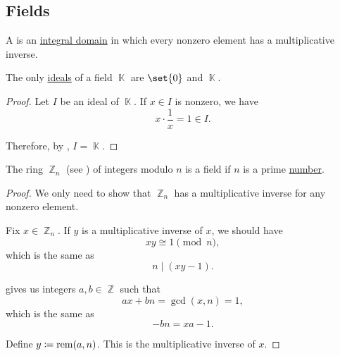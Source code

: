 \subsection{Fields}\label{subsec:fields}

\begin{definition}\label{def:field}
  A  is an \hyperref[def:integral_domain]{integral domain} in which every nonzero element has a multiplicative inverse.
\end{definition}

\begin{proposition}\label{thm:ideals_of_field}
  The only \hyperref[def:semiring_ideal]{ideals} of a field \( \BbbK \) are \( \set{ 0 } \) and \( \BbbK \).
\end{proposition}
\begin{proof}
  Let \( I \) be an ideal of \( \BbbK \). If \( x \in I \) is nonzero, we have
  \begin{equation*}
    x \cdot \frac 1 x = 1 \in I.
  \end{equation*}

  Therefore, by , \( I = \BbbK \).
\end{proof}

\begin{theorem}\label{thm:ring_of_integers_module_prime_is_field}
  The ring \( \BbbZ_n \) (see ) of integers modulo \( n \) is a field if \( n \) is a prime \hyperref[def:prime_number]{number}.
\end{theorem}
\begin{proof}
  We only need to show that \( \BbbZ_n \) has a multiplicative inverse for any nonzero element.

  Fix \( x \in \BbbZ_n \). If \( y \) is a multiplicative inverse of \( x \), we should have
  \begin{equation*}
    xy \cong 1 \pmod n,
  \end{equation*}
  which is the same as
  \begin{equation*}
    n \mid (xy - 1).
  \end{equation*}

   gives us integers \( a, b \in \BbbZ \) such that
  \begin{equation*}
    ax + bn = \gcd(x, n) = 1,
  \end{equation*}
  which is the same as
  \begin{equation*}
    -bn = xa - 1.
  \end{equation*}

  Define \( y \coloneqq \operatorname{rem}(a, n) \). This is the multiplicative inverse of \( x \).
\end{proof}

